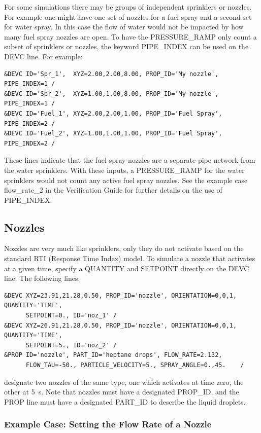 \documentclass[11pt]{book}
\begin{document}
For some simulations there may be groups of independent sprinklers or nozzles.  For example one might have one set of nozzles for a fuel spray and a second set for water spray.  In this case the flow of water would not be impacted by how many fuel spray nozzles are open.  To have the {\ct PRESSURE\_RAMP} only count a subset of sprinklers or nozzles, the keyword {\ct PIPE\_INDEX} can be used on the {\ct DEVC} line. For example:
\begin{lstlisting}
&DEVC ID='Spr_1',  XYZ=2.00,2.00,8.00, PROP_ID='My nozzle',  PIPE_INDEX=1 /
&DEVC ID='Spr_2',  XYZ=1.00,1.00,8.00, PROP_ID='My nozzle',  PIPE_INDEX=1 /
&DEVC ID='Fuel_1', XYZ=2.00,2.00,1.00, PROP_ID='Fuel Spray', PIPE_INDEX=2 /
&DEVC ID='Fuel_2', XYZ=1.00,1.00,1.00, PROP_ID='Fuel Spray', PIPE_INDEX=2 /
\end{lstlisting}
These lines indicate that the fuel spray nozzles are a separate pipe network from the water sprinklers.  With these inputs, a {\ct PRESSURE\_RAMP} for the water sprinklers would not count any active fuel spray nozzles.  See the example case {\ct flow\_rate\_2} in the Verification Guide for further details on the use of {\ct PIPE\_INDEX}.

\subsection{Nozzles}
\label{info:nozzles}

Nozzles are very much like sprinklers, only they do not activate based on the standard RTI (Response Time Index) model. To simulate a nozzle that activates at a given time, specify a {\ct QUANTITY} and {\ct SETPOINT} directly on the {\ct DEVC} line. The following lines:
\begin{lstlisting}
&DEVC XYZ=23.91,21.28,0.50, PROP_ID='nozzle', ORIENTATION=0,0,1, QUANTITY='TIME',
      SETPOINT=0., ID='noz_1' /
&DEVC XYZ=26.91,21.28,0.50, PROP_ID='nozzle', ORIENTATION=0,0,1, QUANTITY='TIME',
      SETPOINT=5., ID='noz_2' /
&PROP ID='nozzle', PART_ID='heptane drops', FLOW_RATE=2.132,
      FLOW_TAU=-50., PARTICLE_VELOCITY=5., SPRAY_ANGLE=0.,45.    /
\end{lstlisting}
designate two nozzles of the same type, one which activates at time zero, the other at 5~s. Note that nozzles must have a designated
{\ct PROP\_ID}, and the {\ct PROP} line must have a designated {\ct PART\_ID} to describe the liquid droplets.

\subsubsection{Example Case: Setting the Flow Rate of a Nozzle}
\end{document}
